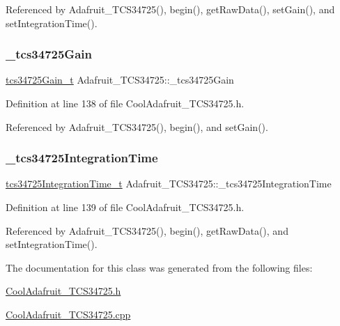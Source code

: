Referenced by Adafruit\+\_\+\+T\+C\+S34725(), begin(), get\+Raw\+Data(), set\+Gain(), and set\+Integration\+Time().

\mbox{\label{class_adafruit___t_c_s34725_ae614cd13b99a10b8e05ec78cab05c700}} 
\subsubsection{\texorpdfstring{\+\_\+tcs34725\+Gain}{\_tcs34725Gain}}
{\footnotesize\ttfamily \hyperlink{_cool_adafruit___t_c_s34725_8h_a23611ba111ac38012551332ee7189f9a}{tcs34725\+Gain\+\_\+t} Adafruit\+\_\+\+T\+C\+S34725\+::\+\_\+tcs34725\+Gain\hspace{0.3cm}{\ttfamily [private]}}



Definition at line 138 of file Cool\+Adafruit\+\_\+\+T\+C\+S34725.\+h.



Referenced by Adafruit\+\_\+\+T\+C\+S34725(), begin(), and set\+Gain().

\mbox{\label{class_adafruit___t_c_s34725_afbfddd381324226265955f436c82efd3}} 
\subsubsection{\texorpdfstring{\+\_\+tcs34725\+Integration\+Time}{\_tcs34725IntegrationTime}}
{\footnotesize\ttfamily \hyperlink{_cool_adafruit___t_c_s34725_8h_a09f4624f70b21f0ec2526dbaedb5895e}{tcs34725\+Integration\+Time\+\_\+t} Adafruit\+\_\+\+T\+C\+S34725\+::\+\_\+tcs34725\+Integration\+Time\hspace{0.3cm}{\ttfamily [private]}}



Definition at line 139 of file Cool\+Adafruit\+\_\+\+T\+C\+S34725.\+h.



Referenced by Adafruit\+\_\+\+T\+C\+S34725(), begin(), get\+Raw\+Data(), and set\+Integration\+Time().



The documentation for this class was generated from the following files\+:\begin{DoxyCompactItemize}
\item 
\hyperlink{_cool_adafruit___t_c_s34725_8h}{Cool\+Adafruit\+\_\+\+T\+C\+S34725.\+h}\item 
\hyperlink{_cool_adafruit___t_c_s34725_8cpp}{Cool\+Adafruit\+\_\+\+T\+C\+S34725.\+cpp}\end{DoxyCompactItemize}
